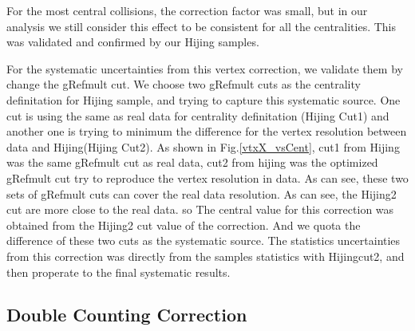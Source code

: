 
For the most central collisions, the correction factor was small, but in our analysis we still consider  this effect to be consistent for all the centralities. This was validated and confirmed by our Hijing samples.

For the systematic uncertainties from this vertex correction, we validate them by change the gRefmult cut. We choose two gRefmult cuts as the centrality definitation for Hijing sample, and trying to capture this systematic source. One cut is using the same as real data for centrality definitation (Hijing Cut1) and another one is trying to minimum the difference for the vertex resolution between data and Hijing(Hijing Cut2). As shown in Fig.\ref{vtxX_vsCent}, cut1 from Hijing was the same gRefmult cut as real data, cut2 from hijing was the optimized gRefmult cut try to reproduce the vertex resolution in data. As can see, these two sets of gRefmult cuts can cover the real data resolution. As can see, the Hijing2 cut are more close to the real data. so The central value for this correction was obtained from the Hijing2 cut value of the correction. And we quota the difference of these two cuts as the systematic source. The statistics uncertainties from this correction was directly from the samples statistics with Hijingcut2, and then properate to the final systematic results.%


\subsection{Double Counting Correction} 



